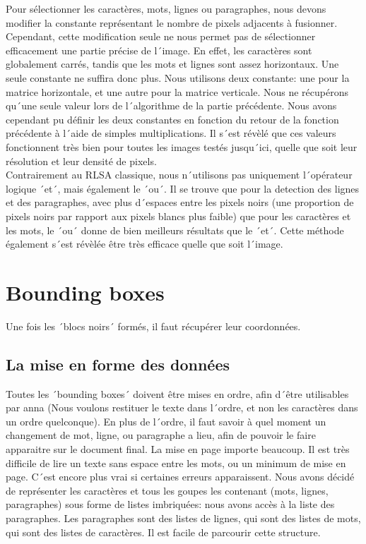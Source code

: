 Pour sélectionner les caractères, mots, lignes ou paragraphes, nous devons modifier la constante représentant le nombre de pixels adjacents à fusionner. Cependant, cette modification seule ne nous permet pas de sélectionner efficacement une partie précise de l´image. En effet, les caractères sont globalement carrés, tandis que les mots et lignes sont assez horizontaux. Une seule constante ne suffira donc plus. Nous utilisons deux constante: une pour la matrice horizontale, et une autre pour la matrice verticale. Nous ne récupérons qu´une seule valeur lors de l´algorithme de la partie précédente. Nous avons cependant pu définir les deux constantes en fonction du retour de la fonction précédente à l´aide de simples multiplications. Il s´est révèlé que ces valeurs fonctionnent très bien pour toutes les images testés jusqu´ici, quelle que soit leur résolution et leur densité de pixels.\\
Contrairement au RLSA classique, nous n´utilisons pas uniquement l´opérateur logique ´et´, mais également le ´ou´. Il se trouve que pour la detection des lignes et des paragraphes, avec plus d´espaces entre les pixels noirs (une proportion de pixels noirs par rapport aux pixels blancs plus faible) que pour les caractères et les mots, le ´ou´ donne de bien meilleurs résultats que le ´et´. Cette méthode également s´est révèlée être très efficace quelle que soit l´image.


\section{Bounding boxes}

Une fois les ´blocs noirs´ formés, il faut récupérer leur coordonnées.  


\subsection{La mise en forme des données}

Toutes les ´bounding boxes´ doivent être mises en ordre, afin d´être utilisables par anna (Nous voulons restituer le texte dans l´ordre, et non les caractères dans un ordre quelconque). En plus de l´ordre, il faut savoir à quel moment un changement de mot, ligne, ou paragraphe a lieu, afin de pouvoir le faire apparaitre sur le document final. La mise en page importe beaucoup. Il est très difficile de lire un texte sans espace entre les mots, ou un minimum de mise en page. C´est encore plus vrai si certaines erreurs apparaissent. Nous avons décidé de représenter les caractères et tous les goupes les contenant (mots, lignes, paragraphes) sous forme de listes imbriquées: nous avons accès à la liste des paragraphes. Les paragraphes sont des listes de lignes, qui sont des listes de mots, qui sont des listes de caractères. Il est facile de parcourir cette structure.


\begin{center}
\end{center}

\begin{center}
\end{center}
